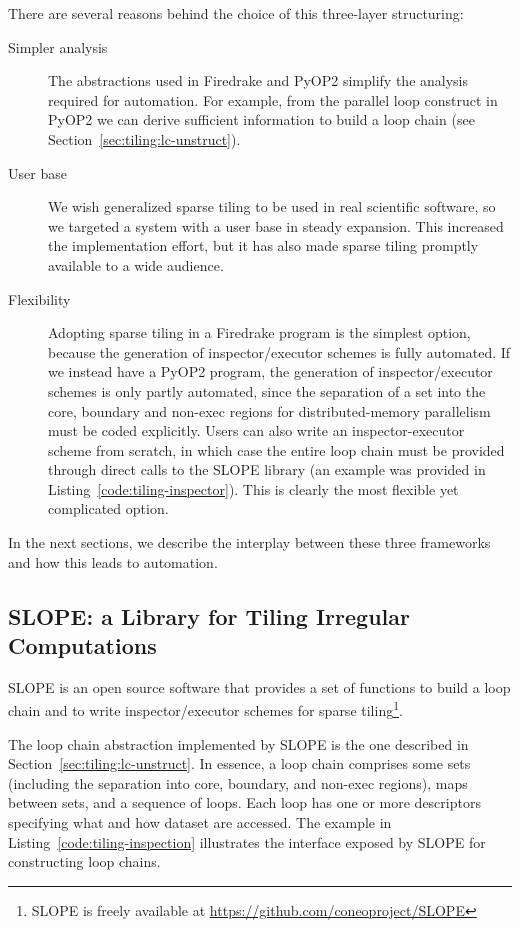 There are several reasons behind the choice of this three-layer structuring:
\begin{description}
\item[Simpler analysis] The abstractions used in Firedrake and PyOP2 simplify the analysis required for automation. For example, from the parallel loop construct in PyOP2 we can derive sufficient information to build a loop chain (see Section~\ref{sec:tiling:lc-unstruct}).
\item[User base] We wish generalized sparse tiling to be used in real scientific software, so we targeted a system with a user base in steady expansion. This increased the implementation effort, but it has also made sparse tiling promptly available to a wide audience.
\item[Flexibility] Adopting sparse tiling in a Firedrake program is the simplest option, because the generation of inspector/executor schemes is fully automated. If we instead have a PyOP2 program, the generation of inspector/executor schemes is only partly automated, since the separation of a set into the core, boundary and non-exec regions for distributed-memory parallelism must be coded explicitly. Users can also write an inspector-executor scheme from scratch, in which case the entire loop chain must be provided through direct calls to the SLOPE library (an example was provided in Listing~\ref{code:tiling-inspector}). This is clearly the most flexible yet complicated option. 
\end{description}



In the next sections, we describe the interplay between these three frameworks and how this leads to automation.

\subsection{SLOPE: a Library for Tiling Irregular Computations}
\label{sec:tiling:impl-slope}
SLOPE is an open source software that provides a set of functions to build a loop chain and to write inspector/executor schemes for sparse tiling\footnote{SLOPE is freely available at \url{https://github.com/coneoproject/SLOPE}}. 

The loop chain abstraction implemented by SLOPE is the one described in Section~\ref{sec:tiling:lc-unstruct}. In essence, a loop chain comprises some sets (including the separation into core, boundary, and non-exec regions), maps between sets, and a sequence of loops. Each loop has one or more descriptors specifying what and how dataset are accessed. The example in Listing~\ref{code:tiling-inspection} illustrates the interface exposed by SLOPE for constructing loop chains. 

